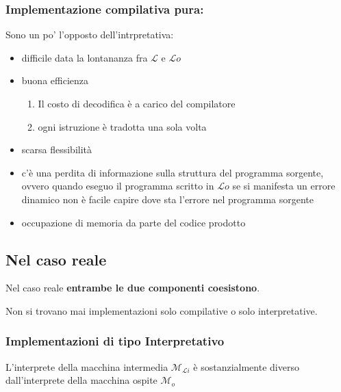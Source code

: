 \documentclass[a4paper,11pt,hidelinks]{book}
\theoremstyle{definition}
\begin{document}
    \subsubsection{Implementazione compilativa pura:}
    Sono un po' l'opposto dell'intrpretativa:
    \begin{itemize}
        \item difficile data la lontananza fra $\mathcal{L}$ e $\mathcal{L}o$
        \item buona efficienza
        \begin{enumerate}
            \item Il costo di decodifica è a carico del compilatore
            \item ogni istruzione è tradotta una sola volta
        \end{enumerate}
        \item scarsa flessibilità 
        \item c'è una perdita di informazione sulla struttura del programma sorgente, ovvero quando eseguo il programma scritto in $\mathcal{L}o$ se si manifesta un errore dinamico non è facile capire dove sta l'errore nel programma sorgente
        \item occupazione di memoria da parte del codice prodotto
    \end{itemize}
    
    \newpage
    
    \subsection{Nel caso reale}
    Nel caso reale \textbf{entrambe le due componenti coesistono}.
    
    Non si trovano mai implementazioni solo compilative o solo interpretative.
    
    \subsubsection{Implementazioni di tipo Interpretativo}
    L'interprete della macchina intermedia $\mathcal{M}_{\mathcal{L}i}$ è sostanzialmente diverso dall'interprete della macchina ospite $\mathcal{M}_o$
    
\end{document}
